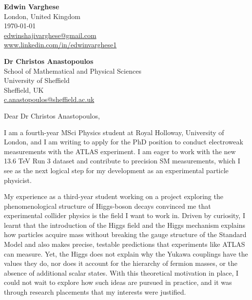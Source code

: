 \documentclass[11pt]{report}
\begin{document}
	\begin{titlepage}
		
		\begin{minipage}[t]{0.90\textwidth}
			\hfill
			\raggedleft
			\textbf{Edwin Varghese} \\
			London, United Kingdom \\
			\today\\
			\href{mailto:edwinshajivarghese@gmail.com}{edwinshajivarghese@gmail.com} \\
			\url{www.linkedin.com/in/edwinvarghese1}
		\end{minipage}
		
		\raggedright \textbf{Dr Christos Anastopoulos} \\ School of Mathematical and Physical Sciences \\ University of Sheffield \\ Sheffield, UK\\ \href{mailto:c.anastopoulos@sheffield.ac.uk}{c.anastopoulos@sheffield.ac.uk}\\
		
		\vspace{0.7em}
		
		\raggedright Dear Dr Christos Anastopoulos,\\
		\vspace{0.7em}
		
		I am a fourth-year MSci Physics student at Royal Holloway, University of London, and I am writing to apply for the PhD position to conduct electroweak measurements with the ATLAS experiment. I am eager to work with the new 13.6 TeV Run 3 dataset and contribute to precision SM measurements, which I see as the next logical step for my development as an experimental particle physicist.\\
		\vspace{0.7em}
		
		My experience as a third-year student working on a project exploring the phenomenological structure of Higgs-boson decays convinced me that experimental collider physics is the field I want to work in. Driven by curiosity, I learnt that the introduction of the Higgs field and the Higgs mechanism explains how particles acquire mass without breaking the gauge structure of the Standard Model and also makes precise, testable predictions that experiments like ATLAS can measure. Yet, the Higgs does not explain why the Yukawa couplings have the values they do, nor does it account for the hierarchy of fermion masses, or the absence of additional scalar states. With this theoretical motivation in place, I could not wait to explore how such ideas are pursued in practice, and it was through research placements that my interests were justified.\\
		\vspace{0.7em}
		

\end{titlepage}
\end{document}
